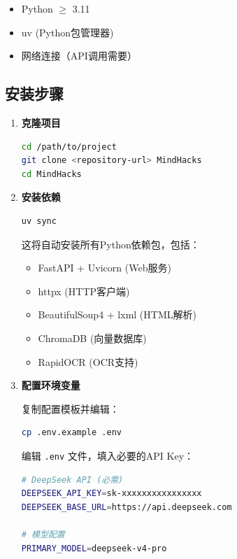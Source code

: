 \documentclass[12pt,a4paper]{ctexart}
\begin{document}
\begin{itemize}[leftmargin=*]
    \item Python $\geq$ 3.11
    \item uv (Python包管理器)
    \item 网络连接（API调用需要）
\end{itemize}

\subsection{安装步骤}

\begin{enumerate}[leftmargin=*]

\item \textbf{克隆项目}

\begin{lstlisting}[language=bash]
cd /path/to/project
git clone <repository-url> MindHacks
cd MindHacks
\end{lstlisting}

\item \textbf{安装依赖}

\begin{lstlisting}[language=bash]
uv sync
\end{lstlisting}

这将自动安装所有Python依赖包，包括：
\begin{itemize}
    \item FastAPI + Uvicorn (Web服务)
    \item httpx (HTTP客户端)
    \item BeautifulSoup4 + lxml (HTML解析)
    \item ChromaDB (向量数据库)
    \item RapidOCR (OCR支持)
\end{itemize}

\item \textbf{配置环境变量}

复制配置模板并编辑：

\begin{lstlisting}[language=bash]
cp .env.example .env
\end{lstlisting}

编辑 \texttt{.env} 文件，填入必要的API Key：

\begin{lstlisting}[language=bash]
# DeepSeek API (必需)
DEEPSEEK_API_KEY=sk-xxxxxxxxxxxxxxxx
DEEPSEEK_BASE_URL=https://api.deepseek.com

# 模型配置
PRIMARY_MODEL=deepseek-v4-pro


\end{lstlisting}
\end{enumerate}
\end{document}
